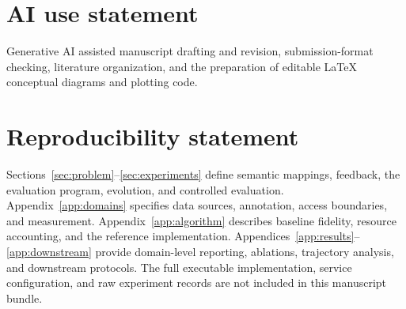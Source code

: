 \section*{AI use statement}

Generative AI assisted manuscript drafting and revision, submission-format checking,
literature organization, and the
preparation of editable LaTeX conceptual diagrams and plotting code.


\section*{Reproducibility statement}

Sections~\ref{sec:problem}--\ref{sec:experiments} define semantic mappings, feedback, the evaluation program, evolution, and controlled evaluation.
Appendix~\ref{app:domains} specifies data sources, annotation, access boundaries, and measurement.
Appendix~\ref{app:algorithm} describes baseline fidelity, resource accounting, and the reference implementation.
Appendices~\ref{app:results}--\ref{app:downstream} provide domain-level reporting, ablations, trajectory analysis, and downstream protocols.
The full executable implementation, service configuration, and raw experiment records are not included in this manuscript bundle.
